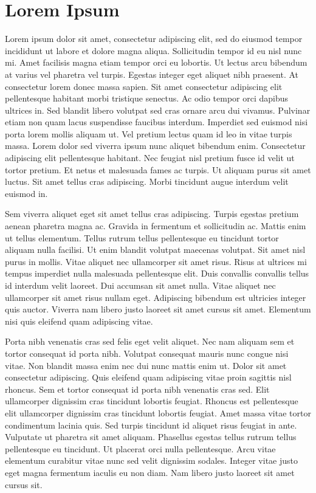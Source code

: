 \documentclass[a4paper]{article}
\begin{document}
\section{Lorem Ipsum}

Lorem ipsum dolor sit amet, consectetur adipiscing elit, sed do eiusmod tempor incididunt ut labore et dolore magna aliqua. Sollicitudin tempor id eu nisl nunc mi. Amet facilisis magna etiam tempor orci eu lobortis. Ut lectus arcu bibendum at varius vel pharetra vel turpis. Egestas integer eget aliquet nibh praesent. At consectetur lorem donec massa sapien. Sit amet consectetur adipiscing elit pellentesque habitant morbi tristique senectus. Ac odio tempor orci dapibus ultrices in. Sed blandit libero volutpat sed cras ornare arcu dui vivamus. Pulvinar etiam non quam lacus suspendisse faucibus interdum. Imperdiet sed euismod nisi porta lorem mollis aliquam ut. Vel pretium lectus quam id leo in vitae turpis massa. Lorem dolor sed viverra ipsum nunc aliquet bibendum enim. Consectetur adipiscing elit pellentesque habitant. Nec feugiat nisl pretium fusce id velit ut tortor pretium. Et netus et malesuada fames ac turpis. Ut aliquam purus sit amet luctus. Sit amet tellus cras adipiscing. Morbi tincidunt augue interdum velit euismod in.

Sem viverra aliquet eget sit amet tellus cras adipiscing. Turpis egestas pretium aenean pharetra magna ac. Gravida in fermentum et sollicitudin ac. Mattis enim ut tellus elementum. Tellus rutrum tellus pellentesque eu tincidunt tortor aliquam nulla facilisi. Ut enim blandit volutpat maecenas volutpat. Sit amet nisl purus in mollis. Vitae aliquet nec ullamcorper sit amet risus. Risus at ultrices mi tempus imperdiet nulla malesuada pellentesque elit. Duis convallis convallis tellus id interdum velit laoreet. Dui accumsan sit amet nulla. Vitae aliquet nec ullamcorper sit amet risus nullam eget. Adipiscing bibendum est ultricies integer quis auctor. Viverra nam libero justo laoreet sit amet cursus sit amet. Elementum nisi quis eleifend quam adipiscing vitae.

Porta nibh venenatis cras sed felis eget velit aliquet. Nec nam aliquam sem et tortor consequat id porta nibh. Volutpat consequat mauris nunc congue nisi vitae. Non blandit massa enim nec dui nunc mattis enim ut. Dolor sit amet consectetur adipiscing. Quis eleifend quam adipiscing vitae proin sagittis nisl rhoncus. Sem et tortor consequat id porta nibh venenatis cras sed. Elit ullamcorper dignissim cras tincidunt lobortis feugiat. Rhoncus est pellentesque elit ullamcorper dignissim cras tincidunt lobortis feugiat. Amet massa vitae tortor condimentum lacinia quis. Sed turpis tincidunt id aliquet risus feugiat in ante. Vulputate ut pharetra sit amet aliquam. Phasellus egestas tellus rutrum tellus pellentesque eu tincidunt. Ut placerat orci nulla pellentesque. Arcu vitae elementum curabitur vitae nunc sed velit dignissim sodales. Integer vitae justo eget magna fermentum iaculis eu non diam. Nam libero justo laoreet sit amet cursus sit.
\end{document}

